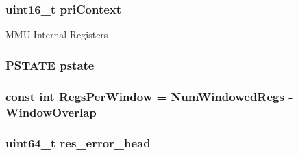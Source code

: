 \label{classSparcISA_1_1ISA_a66223bd530b4057219479647e23beed6}
\hypertarget{classSparcISA_1_1ISA_a5fe352a7943e22456a05c5300a6a49ae}{
\subsubsection[{priContext}]{\setlength{\rightskip}{0pt plus 5cm}uint16\_\-t {\bf priContext}}}
\label{classSparcISA_1_1ISA_a5fe352a7943e22456a05c5300a6a49ae}
MMU Internal Registers \hypertarget{classSparcISA_1_1ISA_af3e9d055518924e91c868c1caeabf960}{
\subsubsection[{pstate}]{\setlength{\rightskip}{0pt plus 5cm}PSTATE {\bf pstate}}}
\label{classSparcISA_1_1ISA_af3e9d055518924e91c868c1caeabf960}
\hypertarget{classSparcISA_1_1ISA_ae0502aa41dafc203f8470512a2ca6fe8}{
\subsubsection[{RegsPerWindow}]{\setlength{\rightskip}{0pt plus 5cm}const int {\bf RegsPerWindow} = {\bf NumWindowedRegs} -\/ {\bf WindowOverlap}}}
\label{classSparcISA_1_1ISA_ae0502aa41dafc203f8470512a2ca6fe8}
\hypertarget{classSparcISA_1_1ISA_a82458e32f522aa74099e9d613b09af6e}{
\subsubsection[{res\_\-error\_\-head}]{\setlength{\rightskip}{0pt plus 5cm}uint64\_\-t {\bf res\_\-error\_\-head}}}
\label{classSparcISA_1_1ISA_a82458e32f522aa74099e9d613b09af6e}

